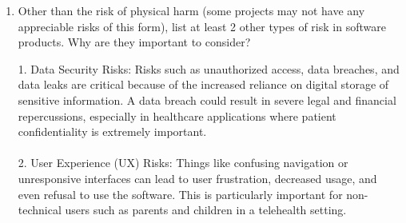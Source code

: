 \documentclass{article}
\begin{document}
\begin{enumerate}
    \item Other than the risk of physical harm (some projects may not have any
    appreciable risks of this form), list at least 2 other types of risk in
    software products. Why are they important to consider?

    1. Data Security Risks: Risks such as unauthorized access, data breaches, and data leaks are critical because of the 
    increased reliance on digital storage of sensitive information. A data breach could result in severe legal and 
    financial repercussions, especially in healthcare applications where patient confidentiality is extremely important. \\\\
	2. User Experience (UX) Risks: Things like confusing navigation or unresponsive interfaces can lead to user 
    frustration, decreased usage, and even refusal to use the software. This is particularly important for non-technical 
    users such as parents and children in a telehealth setting.

\end{enumerate}
\end{document}
